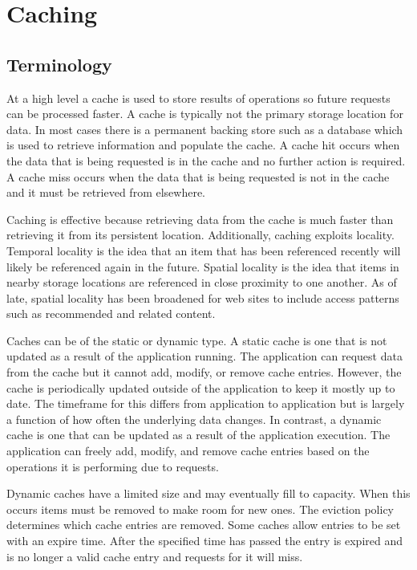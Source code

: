 \documentclass[12pt]{ucthesis}
\begin{document}
\section{Caching}

\subsection{Terminology}
At a high level a cache is used to store results of operations so future requests can be processed faster.
A cache is typically not the primary storage location for data.
In most cases there is a permanent backing store such as a database which is used to retrieve information and populate the cache.
A cache hit occurs when the data that is being requested is in the cache and no further action is required.
A cache miss occurs when the data that is being requested is not in the cache and it must be retrieved from elsewhere.

Caching is effective because retrieving data from the cache is much faster than retrieving it from its persistent location.
Additionally, caching exploits locality.
Temporal locality is the idea that an item that has been referenced recently will likely be referenced again in the future.
Spatial locality is the idea that items in nearby storage locations are referenced in close proximity to one another.
As of late, spatial locality has been broadened for web sites to include access patterns such as recommended and related content.

Caches can be of the static or dynamic type.
A static cache is one that is not updated as a result of the application running.
The application can request data from the cache but it cannot add, modify, or remove cache entries.
However, the cache is periodically updated outside of the application to keep it mostly up to date.
The timeframe for this differs from application to application but is largely a function of how often the underlying data changes.
In contrast, a dynamic cache is one that can be updated as a result of the application execution.
The application can freely add, modify, and remove cache entries based on the operations it is performing due to requests.

Dynamic caches have a limited size and may eventually fill to capacity.
When this occurs items must be removed to make room for new ones.
The eviction policy determines which cache entries are removed.
Some caches allow entries to be set with an expire time.
After the specified time has passed the entry is expired and is no longer a valid cache entry and requests for it will miss.
\end{document}
